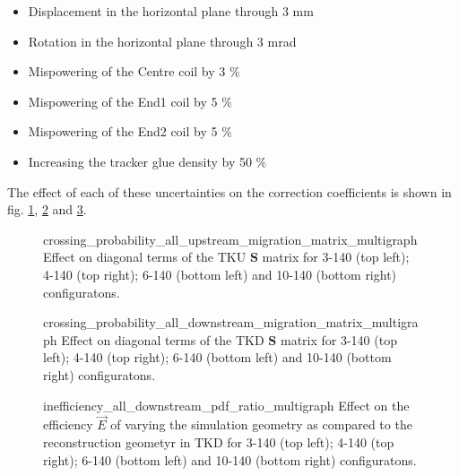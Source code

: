 \begin{itemize}
\item Displacement in the horizontal plane through 3 mm
\item Rotation in the horizontal plane through 3 mrad
\item Mispowering of the Centre coil by 3 $\%$
\item Mispowering of the End1 coil by 5 $\%$
\item Mispowering of the End2 coil by 5 $\%$
\item Increasing the tracker glue density by 50 $\%$
\end{itemize}

The effect of each of these uncertainties on the correction coefficients is 
shown in fig. \ref{fig:crossing_probability_systematic_tku},
\ref{fig:crossing_probability_systematic_tkd} and 
\ref{fig:inefficiency_systematic_tkd}.

\begin{figure}[!tbh]
                     {crossing_probability_all_upstream_migration_matrix_multigraph}
        {Effect on diagonal terms of the TKU $\mathbf{S}$ matrix for 3-140 (top 
         left); 4-140 (top right); 6-140 (bottom left) and 10-140 (bottom right) 
         configuratons. \label{fig:crossing_probability_systematic_tku}}
\end{figure}

\begin{figure}[!tbh]
                     {crossing_probability_all_downstream_migration_matrix_multigraph}
        {Effect on diagonal terms of the TKD $\mathbf{S}$ matrix for 3-140 (top 
         left); 4-140 (top right); 6-140 (bottom left) and 10-140 (bottom right) 
         configuratons. \label{fig:crossing_probability_systematic_tkd}}
\end{figure}

\begin{figure}[!tbh]
                     {inefficiency_all_downstream_pdf_ratio_multigraph}
        {Effect on the efficiency $\vec{E}$ of varying the simulation geometry
         as compared to the reconstruction geometyr in  TKD for 3-140 (top 
         left); 4-140 (top right); 6-140 (bottom left) and 10-140 (bottom right) 
         configuratons. \label{fig:inefficiency_systematic_tkd}}
\end{figure}

